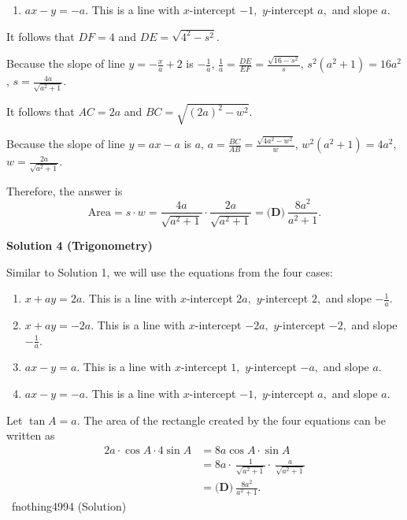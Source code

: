\begin{enumerate}
\begin{enumerate}
        \item $ax-y=-a.$ This is a line with $x$-intercept $-1,$ $y$-intercept $a,$ and slope $a.$

            \end{enumerate}
            It follows that $DF = 4$ and $DE = \sqrt{4^2 - s^2}$.

 Because the slope of line $y = -\frac{x}{a} + 2$ is $-\frac{1}{a}$, $\frac{1}{a} = \frac{DE}{EF} = \frac{\sqrt{16-s^2}}{s}$, $s^2(a^2+1) = 16a^2$, $s = \frac{4a}{\sqrt{a^2+1}}$.

 It follows that $AC = 2a$ and $BC = \sqrt{(2a)^2 - w^2}$.

 Because the slope of line $y = ax - a$ is $a$, $a = \frac{BC}{AB} = \frac{\sqrt{4a^2-w^2}}{w}$, $w^2(a^2+1)=4a^2$, $w=\frac{2a}{\sqrt{a^2+1}}$.

 Therefore, the answer is 
 \[\text{Area} = s \cdot w=\frac{4a}{\sqrt{a^2+1}} \cdot \frac{2a}{\sqrt{a^2+1}} = \boxed{\textbf{(D)} ~\frac{8a^2}{a^2+1}}.\]




\textbf{Solution 4 (Trigonometry)}

Similar to Solution 1, we will use the equations from the four cases:

 
            \begin{enumerate} 
        \item $x+ay=2a.$ This is a line with $x$-intercept $2a,$ $y$-intercept $2,$ and slope $-\frac 1a.$

        \item $x+ay=-2a.$ This is a line with $x$-intercept $-2a,$ $y$-intercept $-2,$ and slope $-\frac 1a.$

        \item $ax-y=a.$ This is a line with $x$-intercept $1,$ $y$-intercept $-a,$ and slope $a.$

        \item $ax-y=-a.$ This is a line with $x$-intercept $-1,$ $y$-intercept $a,$ and slope $a.$

            \end{enumerate}
            Let $\tan A=a.$ The area of the rectangle created by the four equations can be written as 
 \begin{align*} 2a\cdot \cos A\cdot4\sin A &= 8a\cos A \cdot \sin A \\ &= 8a\cdot~\frac{1}{\sqrt{a^2+1}}\cdot~\frac{a}{\sqrt{a^2+1}} \\ &= \boxed{\textbf{(D)} ~\frac{8a^2}{a^2+1}}. \end{align*}
~fnothing4994 (Solution)


\end{enumerate}
